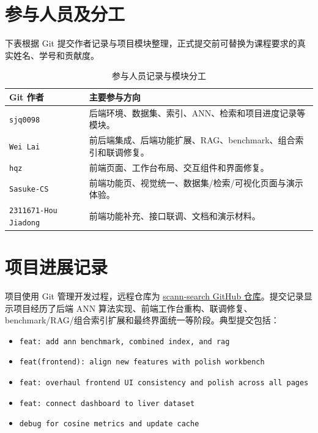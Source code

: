 \documentclass[UTF8,a4paper,12pt]{ctexrep}
\begin{document}
\section{参与人员及分工}

下表根据 Git 提交作者记录与项目模块整理，正式提交前可替换为课程要求的真实姓名、学号和贡献度。

\begin{table}[H]
  \centering
  \caption{参与人员记录与模块分工}
  \begin{tabularx}{0.95\textwidth}{lY}
    \toprule
    Git 作者 & 主要参与方向 \\
    \midrule
    \texttt{sjq0098} & 后端环境、数据集、索引、ANN、检索和项目进度记录等模块。 \\
    \texttt{Wei Lai} & 前后端集成、后端功能扩展、RAG、benchmark、组合索引和联调修复。 \\
    \texttt{hqz} & 前端页面、工作台布局、交互组件和界面修复。 \\
    \texttt{Sasuke-CS} & 前端功能页、视觉统一、数据集/检索/可视化页面与演示体验。 \\
    \texttt{2311671-Hou Jiadong} & 前端功能补充、接口联调、文档和演示材料。 \\
    \bottomrule
  \end{tabularx}
\end{table}

\section{项目进展记录}

项目使用 Git 管理开发过程，远程仓库为 \href{https://github.com/wl-8/scann-search}{scann-search GitHub 仓库}。提交记录显示项目经历了后端 ANN 算法实现、前端工作台重构、联调修复、benchmark/RAG/组合索引扩展和最终界面统一等阶段。典型提交包括：

\begin{itemize}
  \item \texttt{feat: add ann benchmark, combined index, and rag}
  \item \texttt{feat(frontend): align new features with polish workbench}
  \item \texttt{feat: overhaul frontend UI consistency and polish across all pages}
  \item \texttt{feat: connect dashboard to liver dataset}
  \item \texttt{debug for cosine metrics and update cache}
\end{itemize}
\end{document}
